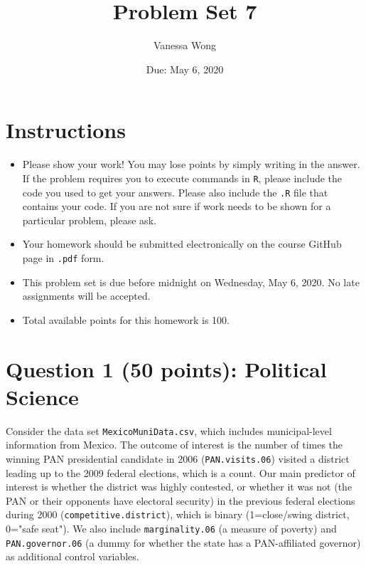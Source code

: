 \documentclass[12pt,letterpaper]{article}
\title{Problem Set 7}
\date{Due: May 6, 2020}
\author{Vanessa Wong}
\begin{document}
	\maketitle
	
	\section*{Instructions}
	\begin{itemize}
		\item Please show your work! You may lose points by simply writing in the answer. If the problem requires you to execute commands in \texttt{R}, please include the code you used to get your answers. Please also include the \texttt{.R} file that contains your code. If you are not sure if work needs to be shown for a particular problem, please ask.
		\item Your homework should be submitted electronically on the course GitHub page in \texttt{.pdf} form.
		\item This problem set is due before midnight on Wednesday, May 6, 2020. No late assignments will be accepted.
		\item Total available points for this homework is 100.
	\end{itemize}
	
	\vspace{.5cm}

\section*{Question 1 (50 points): Political Science}	
\noindent Consider the data set \texttt{MexicoMuniData.csv}, which includes municipal-level information from Mexico. The outcome of interest is the number of times the winning PAN presidential candidate in 2006 (\texttt{PAN.visits.06}) visited a district leading up to the 2009 federal elections, which is a count. Our main predictor of interest is whether the district was highly contested, or whether it was not (the PAN or their opponents have electoral security) in the previous federal elections during 2000 (\texttt{competitive.district}), which is binary (1=close/swing district, 0="safe seat"). We also include \texttt{marginality.06} (a measure of poverty) and \texttt{PAN.governor.06} (a dummy for whether the state has a PAN-affiliated governor) as additional control variables. 
\end{document}
